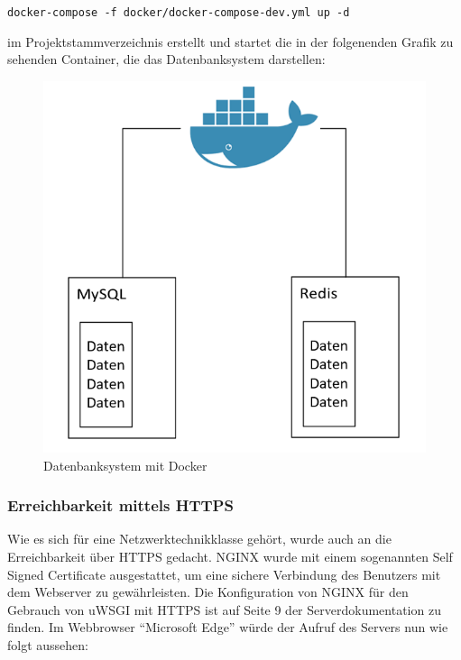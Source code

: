 \texttt{docker-compose\ -f\ docker/docker-compose-dev.yml\ up\ -d}

im Projektstammverzeichnis erstellt und startet die in der folgenenden
Grafik zu sehenden Container, die das Datenbanksystem darstellen:

\begin{figure}[ht]
\centering
\includegraphics{docker.png}
\caption{Datenbanksystem mit Docker}
\end{figure}

\hypertarget{erreichbarkeit-mittels-https}{%
\subsubsection{Erreichbarkeit mittels
HTTPS}\label{erreichbarkeit-mittels-https}}

Wie es sich für eine Netzwerktechnikklasse gehört, wurde auch an die
Erreichbarkeit über HTTPS gedacht. NGINX wurde mit einem sogenannten
Self Signed Certificate ausgestattet, um eine sichere Verbindung des
Benutzers mit dem Webserver zu gewährleisten. Die Konfiguration von
NGINX für den Gebrauch von uWSGI mit HTTPS ist auf Seite 9 der
Serverdokumentation zu finden. Im Webbrowser ``Microsoft Edge'' würde
der Aufruf des Servers nun wie folgt aussehen:

